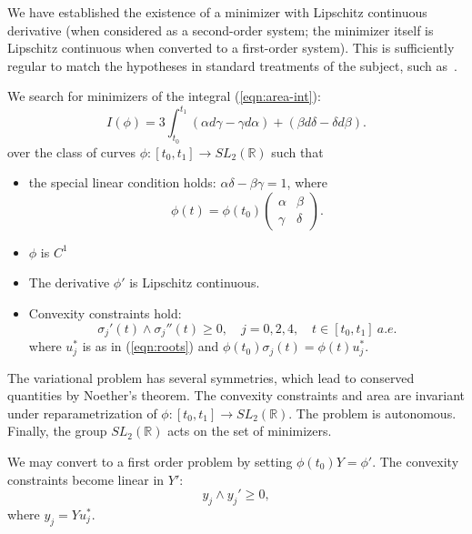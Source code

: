 \documentclass[11pt]{amsart}
\newcommand{\ring}[1]{\mathbb{#1}}
\begin{document}
We have established the existence of a minimizer with Lipschitz
continuous derivative (when considered as a second-order system; the
minimizer itself is Lipschitz continuous when converted to a
first-order system).  This is sufficiently regular to match the
hypotheses in standard treatments of the subject, such as~\cite{Pontryagin:1986}.


We search for minimizers of the integral (\ref{eqn:area-int}):
\begin{equation}
I(\phi) = 3\int_{t_0}^{t_1} (\alpha d\gamma - 
\gamma d\alpha) + (\beta d\delta - \delta d\beta).
\end{equation}
over the class of curves $\phi:[t_0,t_1]\to SL_2(\ring{R})$ such that 
\begin{itemize}
\item the special linear condition holds: $\alpha\delta-\beta\gamma=1$, where
 \[
\phi(t) = \phi(t_0)
\left(\begin{matrix}\alpha&\beta\\\gamma&\delta\end{matrix}\right).
\]
\item $\phi$ is $C^1$
\item The derivative $\phi'$ is Lipschitz continuous.
\item Convexity constraints hold:
  \[\sigma_j'(t) \land \sigma_j''(t) \ge 0,\quad j=0,2,4,\quad t\in[t_0,t_1]~a.e.\]
where $u^*_j$ is as in (\ref{eqn:roots}) and $\phi(t_0)\sigma_j(t) = \phi(t) u^*_j$.
\end{itemize}


The variational problem has several symmetries, which lead to
conserved quantities by Noether's theorem.  The convexity
constraints and area are invariant under reparametrization of
$\phi:[t_0,t_1]\to SL_2(\ring{R})$.  The problem is autonomous.
Finally, the group $SL_2(\ring{R})$ acts on the set of minimizers.

We may convert to a first order problem by setting $\phi(t_0)Y =
\phi'$.  The convexity constraints become linear in $Y'$:
\begin{equation}\label{eqn:curvature}
  y_j \land y_j' \ge 0,
\end{equation}
where $y_j = Y u^*_j$.

\raggedright

\end{document}
